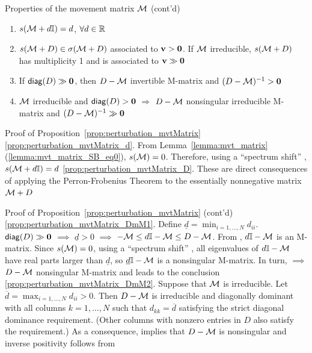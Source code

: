 \documentclass[aspectratio=169]{beamer}
\begin{document}
\begin{frame}{Properties of the movement matrix $\mathcal{M}$ (cont'd)}
	\begin{proposition}\label{prop:perturbation_mvtMatrix}
		\begin{enumerate}
			\item $s(\mathcal{M}+d\mathbb{I})=d$, $\forall d\in\mathbb{R}$ \label{prop:perturbation_mvtMatrix_d}
			\item $s(\mathcal{M}+D)\in\sigma(\mathcal{M}+D)$ associated to $\bv>\b0$. If $\mathcal{M}$ irreducible, $s(\mathcal{M}+D)$ has  multiplicity 1 and is associated to $\bv\gg \b0$ \label{prop:perturbation_mvtMatrix_D}
			\item If $\diag (D)\gg \b0$, then $D-\mathcal{M}$ invertible M-matrix and $(D-\M)^{-1}> \b0$ \label{prop:perturbation_mvtMatrix_DmM1}
			\item $\mathcal{M}$ irreducible and $\diag(D)>\b0$ $\Longrightarrow$ $D-\mathcal{M}$ nonsingular irreducible M-matrix and $(D-\M)^{-1}\gg \b0$ \label{prop:perturbation_mvtMatrix_DmM2}
		\end{enumerate}
	\end{proposition}
\end{frame}


\begin{frame}{Proof of Proposition~\ref{prop:perturbation_mvtMatrix}}
\ref{prop:perturbation_mvtMatrix_d}. From Lemma~\ref{lemma:mvt_matrix}(\ref{lemma:mvt_matrix_SB_eq0}), $s(\mathcal{M})=0$. Therefore, using a ``spectrum shift'' \cite[Problem 1.2.P8]{HornJohnson2013}, $s(\mathcal{M}+d\mathbb{I})=d$
\vfill
\noindent\ref{prop:perturbation_mvtMatrix_D}. These are direct consequences of applying the Perron-Frobenius Theorem to the essentially nonnegative matrix $\mathcal{M}+D$
\vfill
\end{frame}


\begin{frame}{Proof of Proposition~\ref{prop:perturbation_mvtMatrix} (cont'd)}
\noindent\ref{prop:perturbation_mvtMatrix_DmM1}.
Define $\underline{d}=\min_{i=1,\ldots,N}d_{ii}$. $\diag (D)\gg \b0$ $\implies$ $\underline{d}>0$ $\implies$ $-\mathcal{M}\leq d\mathbb{I}-\mathcal{M}\leq D-\mathcal{M}$. From \cite[Theorem 5.2.5]{Fiedler2008}, $d\mathbb{I}-\mathcal{M}$ is an M-matrix. 
Since $s(\mathcal{M})=0$, using a ``spectrum shift'' \cite[Problem 1.2.P8]{HornJohnson2013}, all eigenvalues of $d\mathbb{I}-\mathcal{M}$ have real parts larger
than $\underline{d}$, so $\underline{d}\mathbb{I}-\mathcal{M}$ is a nonsingular M-matrix. 
In turn, \cite[Theorem 5.1.1(4)]{Fiedler2008} $\implies$ $D-\mathcal{M}$ nonsingular M-matrix and \cite[Theorem 5.1.1(11)]{Fiedler2008} leads to the conclusion
\vfill
\noindent\ref{prop:perturbation_mvtMatrix_DmM2}. 
Suppose that $\mathcal{M}$ is irreducible. 
Let $\overline{d}=\max_{i=1,\ldots,N}d_{ii}>0$.
Then $D-\mathcal{M}$ is  irreducible and diagonally dominant with all columns $k=1,\ldots,N$ such that $d_{kk}=\overline{d}$ satisfying the strict diagonal
dominance requirement. (Other columns with nonzero entries in $D$ also satisfy the requirement.)
As a consequence, \cite[Theorem 1.11]{Varga2010} implies that $D-\mathcal{M}$ is nonsingular and inverse positivity follows from \cite[Theorem 5.2.10]{Fiedler2008}
\end{frame}
\end{document}
